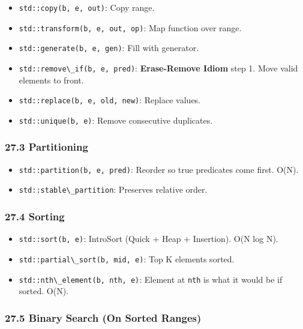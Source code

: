 \begin{itemize}
\tightlist
\item
  \passthrough{\lstinline!std::copy(b, e, out)!}: Copy range.
\item
  \passthrough{\lstinline!std::transform(b, e, out, op)!}: Map function
  over range.
\item
  \passthrough{\lstinline!std::generate(b, e, gen)!}: Fill with
  generator.
\item
  \passthrough{\lstinline!std::remove\_if(b, e, pred)!}:
  \textbf{Erase-Remove Idiom} step 1. Move valid elements to front.
\item
  \passthrough{\lstinline!std::replace(b, e, old, new)!}: Replace
  values.
\item
  \passthrough{\lstinline!std::unique(b, e)!}: Remove consecutive
  duplicates.
\end{itemize}

\hypertarget{partitioning}{%
\subsubsection{27.3 Partitioning}\label{partitioning}}

\begin{itemize}
\tightlist
\item
  \passthrough{\lstinline!std::partition(b, e, pred)!}: Reorder so true
  predicates come first. O(N).
\item
  \passthrough{\lstinline!std::stable\_partition!}: Preserves relative
  order.
\end{itemize}

\hypertarget{sorting}{%
\subsubsection{27.4 Sorting}\label{sorting}}

\begin{itemize}
\tightlist
\item
  \passthrough{\lstinline!std::sort(b, e)!}: IntroSort (Quick + Heap +
  Insertion). O(N log N).
\item
  \passthrough{\lstinline!std::partial\_sort(b, mid, e)!}: Top K
  elements sorted.
\item
  \passthrough{\lstinline!std::nth\_element(b, nth, e)!}: Element at
  \passthrough{\lstinline!nth!} is what it would be if sorted. O(N).
\end{itemize}

\hypertarget{binary-search-on-sorted-ranges}{%
\subsubsection{27.5 Binary Search (On Sorted
Ranges)}\label{binary-search-on-sorted-ranges}}

